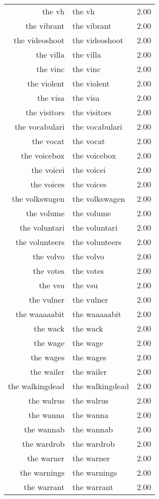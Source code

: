 \begin{table}[ht]
\begin{tabular}{rlr}
  the vh & the vh & 2.00 \\ 
  the vibrant & the vibrant & 2.00 \\ 
  the videoshoot & the videoshoot & 2.00 \\ 
  the villa & the villa & 2.00 \\ 
  the vinc & the vinc & 2.00 \\ 
  the violent & the violent & 2.00 \\ 
  the visa & the visa & 2.00 \\ 
  the visitors & the visitors & 2.00 \\ 
  the vocabulari & the vocabulari & 2.00 \\ 
  the vocat & the vocat & 2.00 \\ 
  the voicebox & the voicebox & 2.00 \\ 
  the voicei & the voicei & 2.00 \\ 
  the voices & the voices & 2.00 \\ 
  the volkswagen & the volkswagen & 2.00 \\ 
  the volume & the volume & 2.00 \\ 
  the voluntari & the voluntari & 2.00 \\ 
  the volunteers & the volunteers & 2.00 \\ 
  the volvo & the volvo & 2.00 \\ 
  the votes & the votes & 2.00 \\ 
  the vsu & the vsu & 2.00 \\ 
  the vulner & the vulner & 2.00 \\ 
  the waaaaabit & the waaaaabit & 2.00 \\ 
  the wack & the wack & 2.00 \\ 
  the wage & the wage & 2.00 \\ 
  the wages & the wages & 2.00 \\ 
  the wailer & the wailer & 2.00 \\ 
  the walkingdead & the walkingdead & 2.00 \\ 
  the walrus & the walrus & 2.00 \\ 
  the wanna & the wanna & 2.00 \\ 
  the wannab & the wannab & 2.00 \\ 
  the wardrob & the wardrob & 2.00 \\ 
  the warner & the warner & 2.00 \\ 
  the warnings & the warnings & 2.00 \\ 
  the warrant & the warrant & 2.00 \\ 

\end{tabular}
\end{table}
